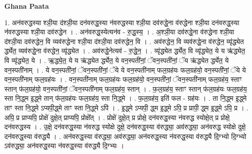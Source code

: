 \documentclass[17pt]{extarticle}
\begin{document}
\textbf{Ghana Paata } \newline

1. अन॑वरुद्धस्या श्ञी॒या द॑श्ञी॒या दन॑वरुद्ध॒स्या न॑वरुद्धस्या श्ञी॒या दव॑रुद्धे॒ना व॑रुद्धेना श्ञी॒या दन॑वरुद्ध॒स्या न॑वरुद्धस्या श्ञी॒या दव॑रुद्धेन । . अन॑वरुद्ध॒स्येत्यन॑व - रु॒द्ध॒स्य॒ । . अ॒श्ञी॒या दव॑रुद्धे॒ना व॑रुद्धेना श्ञी॒या द॑श्ञी॒या दव॑रुद्धेन॒ वि व्यव॑रुद्धेना श्ञी॒या द॑श्ञी॒या दव॑रुद्धेन॒ वि । . अव॑रुद्धेन॒ वि व्यव॑रुद्धे॒ना व॑रुद्धेन॒ व्यृ॑द्ध्येत र्द्ध्येत॒ व्यव॑रुद्धे॒ना व॑रुद्धेन॒ व्यृ॑द्ध्येत । . अव॑रुद्धे॒नेत्यव॑ - रु॒द्धे॒न॒ । . व्यृ॑द्ध्येत र्द्ध्येत॒ वि व्यृ॑द्ध्येत॒ ये य ऋ॑द्ध्येत॒ वि व्यृ॑द्ध्येत॒ ये । . ऋ॒द्ध्ये॒त॒ ये य ऋ॑द्ध्येत र्द्ध्येत॒ ये वन॒स्पती॑नां॒ ॅवन॒स्पती॑नां॒ ॅय ऋ॑द्ध्येत र्द्ध्येत॒ ये वन॒स्पती॑नाम् । . ये वन॒स्पती॑नां॒ ॅवन॒स्पती॑नां॒ ॅये ये वन॒स्पती॑नाम् फल॒ग्रह॑यः फल॒ग्रह॑यो॒ वन॒स्पती॑नां॒ ॅये ये वन॒स्पती॑नाम् फल॒ग्रह॑यः । . वन॒स्पती॑नाम् फल॒ग्रह॑यः फल॒ग्रह॑यो॒ वन॒स्पती॑नां॒ ॅवन॒स्पती॑नाम् फल॒ग्रह॑य॒ स्ताꣳ स्तान् फ॑ल॒ग्रह॑यो॒ वन॒स्पती॑नां॒ ॅवन॒स्पती॑नाम् फल॒ग्रह॑य॒ स्तान् । . फ॒ल॒ग्रह॑य॒ स्ताꣳ स्तान् फ॑ल॒ग्रह॑यः फल॒ग्रह॑य॒ स्ता नि॒द्ध्म इ॒द्ध्मे तान् फ॑ल॒ग्रह॑यः फल॒ग्रह॑य॒ स्ता नि॒द्ध्मे । . फ॒ल॒ग्रह॑य॒ इति॑ फल - ग्रह॑यः । . ता नि॒द्ध्म इ॒द्ध्मे ताꣳ स्ता नि॒द्ध्मे ऽप्यपी॒द्ध्मे ताꣳ स्ता नि॒द्ध्मे ऽपि॑ । . इ॒द्ध्मे ऽप्यपी॒ द्ध्म इ॒द्ध्मे ऽपि॒ प्र प्रापी॒ द्ध्म इ॒द्ध्मे ऽपि॒ प्र । . अपि॒ प्र प्राप्यपि॒ प्रोक्षे॑ दुक्षे॒त् प्राप्यपि॒ प्रोक्षे᳚त् । . प्रोक्षे॑ दुक्षे॒त् प्र प्रोक्षे॒ दन॑वरुद्ध॒स्या न॑वरुद्ध स्योक्षे॒त् प्र प्रोक्षे॒ दन॑वरुद्धस्य । . उ॒क्षे॒ दन॑वरुद्ध॒स्या न॑वरुद्ध स्योक्षे दुक्षे॒ दन॑वरुद्ध॒स्या व॑रुद्ध्या॒ अव॑रुद्ध्या॒ अन॑वरुद्ध स्योक्षे दुक्षे॒ दन॑वरुद्ध॒स्या व॑रुद्ध्यै । . अन॑वरुद्ध॒स्या व॑रुद्ध्या॒ अव॑रुद्ध्या॒ अन॑वरुद्ध॒स्या न॑वरुद्ध॒स्या व॑रुद्ध्यै दि॒ग्भ्यो दि॒ग्भ्यो ऽव॑रुद्ध्या॒ अन॑वरुद्ध॒स्या न॑वरुद्ध॒स्या व॑रुद्ध्यै दि॒ग्भ्यः । \newline
\end{document}
